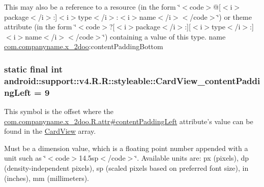 This may also be a reference to a resource (in the form \char`\"{}$<$code$>$@\mbox{[}$<$i$>$package$<$/i$>$:\mbox{]}$<$i$>$type$<$/i$>$:$<$i$>$name$<$/i$>$$<$/code$>$\char`\"{}) or theme attribute (in the form \char`\"{}$<$code$>$?\mbox{[}$<$i$>$package$<$/i$>$:\mbox{]}\mbox{[}$<$i$>$type$<$/i$>$:\mbox{]}$<$i$>$name$<$/i$>$$<$/code$>$\char`\"{}) containing a value of this type.  name \hyperlink{namespacecom_1_1companyname_1_1x__2doo}{com.companyname.x\_\-2doo}:contentPaddingBottom \hypertarget{classandroid_1_1support_1_1v4_1_1_r_1_1styleable_aa20756d855da0a9dc2951095592f94f}{
\subsubsection[{CardView\_\-contentPaddingLeft}]{\setlength{\rightskip}{0pt plus 5cm}static final int android::support::v4.R.R::styleable::CardView\_\-contentPaddingLeft = 9}}
\label{classandroid_1_1support_1_1v4_1_1_r_1_1styleable_aa20756d855da0a9dc2951095592f94f}


This symbol is the offset where the \hyperlink{classcom_1_1companyname_1_1x__2doo_1_1_r_1_1attr_8742b964a2a0c6863c5e54a6781f6e1f}{com.companyname.x\_\-2doo.R.attr\#contentPaddingLeft} attribute's value can be found in the \hyperlink{classandroid_1_1support_1_1v4_1_1_r_1_1styleable_4fcc6453aa91deadd7072add3aee5e56}{CardView} array.

Must be a dimension value, which is a floating point number appended with a unit such as \char`\"{}$<$code$>$14.5sp$<$/code$>$\char`\"{}. Available units are: px (pixels), dp (density-independent pixels), sp (scaled pixels based on preferred font size), in (inches), mm (millimeters). 

